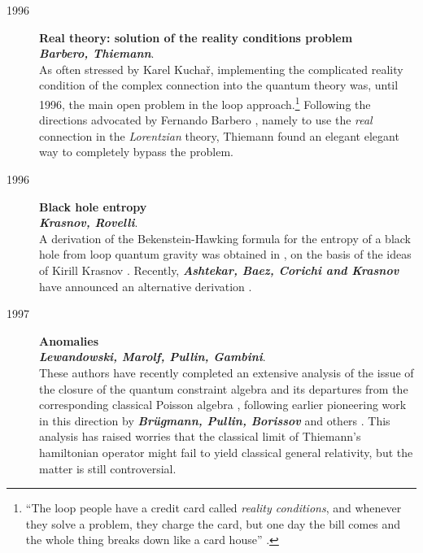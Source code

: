 \begin{description}
    \item[1996] {\bf Real theory: solution of the reality conditions 
    problem\\
    {\em Barbero, Thiemann}}.\\
	As often stressed by Karel Kucha\v{r}, implementing the 
	complicated reality condition of the complex connection into the 
	quantum theory was, until 1996, the main open problem in the loop 
	approach.\footnote{``The loop people have a credit card called 
	{\em reality conditions\/}, and whenever they solve a problem, 
	they charge the card, but one day the bill comes and the whole 
	thing breaks down like a card house'' \cite{kuchar}.} Following 
	the directions advocated by Fernando Barbero 
	\cite{Barbero,Barbero3,Barbero2,Barbero4}, namely to use the {\em 
	real\/} connection in the {\em Lorentzian\/} theory, Thiemann 
	found an elegant elegant way to completely bypass the problem.

	\item[1996] {\bf Black hole entropy\\
	{\em Krasnov, Rovelli}}.\\
	A derivation of the Bekenstein-Hawking formula for the 
	entropy of a black hole from loop quantum gravity was 
	obtained in \cite{Rovelli96}, on the basis of the ideas of 
	Kirill Krasnov \cite{Krasnov,Krasnov2}.  Recently, 
	\textbf{\em Ashtekar, Baez, Corichi and Krasnov} have 
	announced an alternative derivation \cite{AshtekarEtAl97}.

	\item[1997] {\bf  Anomalies\\
	{\em Lewandowski, Marolf, Pullin, Gambini}}.\\
	These authors have recently completed an extensive analysis of the 
	issue of the closure of the quantum constraint algebra and its 
	departures from the corresponding classical Poisson algebra 
	\cite{LewandowskiMarolf,LewandowskiEtAl}, following earlier 
	pioneering work in this direction by \textbf{\em Br\"ugmann, 
	Pullin, Borissov} and others \cite{BruegmannAlgebra,%
	BruegmannPullinAlgebra,GambiniGaratPullin,Borissov97}.  This 
	analysis has raised worries that the classical limit of 
	Thiemann's hamiltonian operator might fail to yield classical 
	general relativity, but the matter is still controversial.


\end{description}
